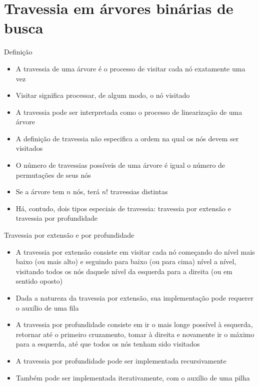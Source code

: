 \section{Travessia em árvores binárias de busca}

\begin{frame}[fragile]{Definição}
	\begin{itemize}
		\item A {travessia de uma árvore} é o processo de visitar cada 
		nó {exatamente uma} vez

        \item Visitar significa processar, de algum modo, o nó visitado

		\item A travessia pode ser interpretada como o processo de 
		{linearização} de uma árvore

		\item A definição de travessia {não} especifica a {ordem} 
		na qual os nós devem ser visitados

		\item O número de travessias possíveis de uma árvore é igual o número 
		de {permutações} de seus nós 

		\item Se a árvore tem $n$ nós, terá $n!$ travessias distintas

		\item Há, contudo, dois tipos {especiais} de travessia: 
		travessia por {extensão} e travessia por {profundidade}
	\end{itemize} 

\end{frame}
 
\begin{frame}[fragile]{Travessia por extensão e por profundidade}

	\begin{itemize}
		\item {A travessia por {extensão} consiste em visitar cada nó 
		começando do nível mais {baixo} (ou mais alto) e seguindo para 
		{baixo} (ou para cima) nível a nível, visitando {todos} 
		os nós {daquele} nível da esquerda para a direita (ou em sentido 
		oposto)}

        \item Dada a natureza da travessia por extensão, sua implementação pode requerer 
            o auxílio de uma fila

        \item {A travessia por {profundidade} consiste em ir o mais longe 
        possível à {esquerda}, retornar até o primeiro cruzamento, tomar à 
        {direita} e novamente ir o máximo para a {esquerda}, até que 
        todos os nós tenham sido visitados} 

        \item A travessia por profundidade pode ser implementada recursivamente

        \item Também pode ser implementada iterativamente, com o auxílio de uma pilha
	\end{itemize}

\end{frame}

